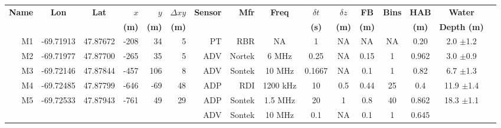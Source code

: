 \begin{sidewaystable}\scriptsize
  \label{t:mooring_table}
  \centering
  \begin{tabular}{|r|c|c|r|r|r|r|r|c|c|c|c|c|c|c|c|} \hline
    {\bf Name}          & {\bf Lon}                  & {\bf Lat}                 & $x$                    & $y$                  & $\Delta xy$         & {\bf Sensor} &{\bf Mfr}   & {\bf Freq}&$\delta t$ &$\delta z$& {\bf FB}   & {\bf Bins} & {\bf HAB}  & {\bf Water}                        \\
    ~                   &                            &                           & {\bf (m)}              & {\bf (m)}            & {\bf (m)}           &              &            &           & {\bf (s)} & {\bf (m)}& {\bf (m)}  &            & {\bf (m)}  & {\bf Depth (m)}                    \\\hline \hline
    M1                  & -69.71913                  & 47.87672                  & -208                   & 34                   & 5                   & PT           & RBR        & NA        & 1         & NA       & NA         & NA         & 0.20       &  2.0 $\pm$1.2                      \\\hline
    M2                  & -69.71977                  & 47.87700                  & -265                   & 35                   & 5                   & ADV          & Nortek     & 6 MHz     & 0.25      & NA       & 0.15       & 1          & 0.962      &  3.0 $\pm$0.9                      \\\hline %
    M3                  & -69.72146                  & 47.87844                  & -457                   & 106                  & 8                   & ADV          & Sontek     & 10 MHz    & 0.1667    & NA       & 0.1        & 1          & 0.82       &  6.7 $\pm$1.3                      \\\hline
    M4                  & -69.72485                  & 47.87799                  & -646                   & -69                  & 48                  & ADP          & RDI        & 1200 kHz  & 10        & 0.5      & 0.44       & 25         & 0.4        &  11.9 $\pm$1.4                     \\\hline
    \multirow{4}{*}{M5} & \multirow{4}{*}{-69.72533} & \multirow{4}{*}{47.87943} & \multirow{4}{*}{-761}  & \multirow{4}{*}{49}  & \multirow{4}{*}{29} & ADP          & Sontek     & 1.5 MHz   & 20        & 1        & 0.8        & 40         & 0.862      &  \multirow{4}{*}{18.3 $\pm$1.1}    \\ 
    ~                   &                            &                           &                        &                      &                     & ADV          & Sontek     & 10 MHz    & 0.1       & NA       & 0.1        & 1          & 0.645      &                                    \\ 

\end{tabular}
\end{sidewaystable}
